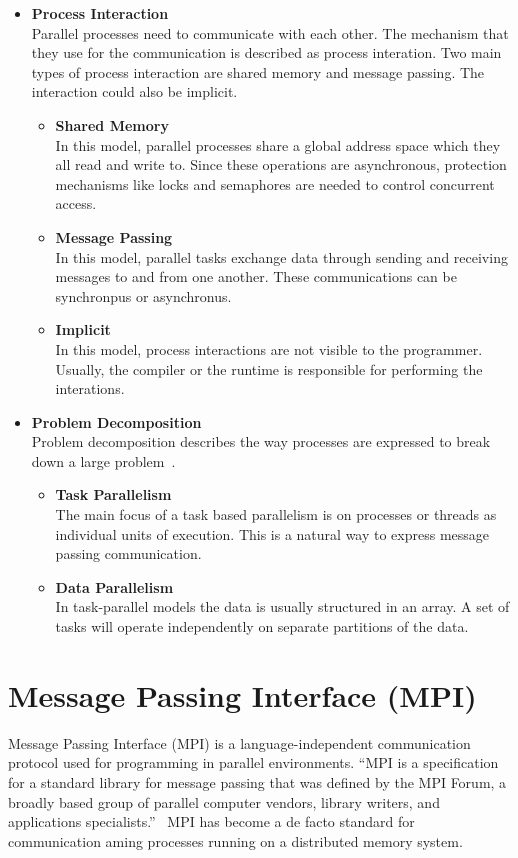\begin{itemize}
\item \textbf{Process Interaction}\\
  Parallel processes need to communicate with each other. The mechanism that they use for the communication is described as process interation. Two main types of process interaction are shared memory and message passing. The interaction could also be implicit.
  \begin{itemize}
  \item \textbf{Shared Memory}\\
    In this model, parallel processes share a global address space which they all read and write to. Since these operations are asynchronous, protection mechanisms like locks and semaphores are needed to control concurrent access.
  \item \textbf{Message Passing}\\
    In this model, parallel tasks exchange data through sending and receiving messages to and from one another. These communications can be synchronpus or asynchronus.
  \item \textbf{Implicit}\\
    In this model, process interactions are not visible to the programmer. Usually, the compiler or the runtime is responsible for performing the interations.
  \end{itemize}
\item \textbf{Problem Decomposition}\\
Problem decomposition describes the way processes are expressed to break down a large problem~\cite{Quinn:2003:PPC:1211440}.
  \begin{itemize}
  \item \textbf{Task Parallelism}\\
    The main focus of a task based parallelism is on processes or threads as individual units of execution. This is a natural way to express message passing communication.
  \item \textbf{Data Parallelism}\\
    In task-parallel models the data is usually structured in an array. A set of tasks will operate independently on separate partitions of the data.     
  \end{itemize}
\end{itemize}


\section{Message Passing Interface (MPI)}
Message Passing Interface (MPI) is a language-independent communication protocol used for programming in parallel environments. ``MPI is a specification for a standard library for message passing that was defined by the MPI Forum, a broadly based group of parallel computer vendors, library writers, and applications specialists.''~\cite{gropp1996high} MPI has become a de facto standard for communication aming processes running on a distributed memory system.

